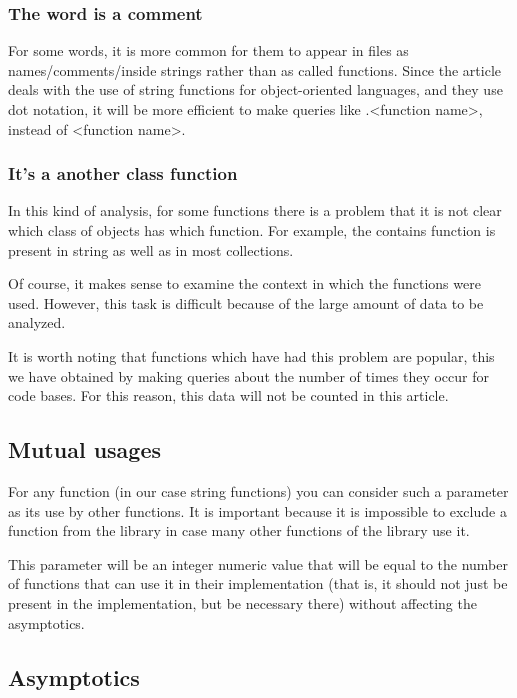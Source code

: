 \documentclass[anonymous,sigplan,review,11pt,nonacm,natbib=false]{acmart}
\begin{document}
    \subsubsection{The word is a comment} \hl{}

    For some words, it is more common for them to appear in files as names/comments/inside strings rather than as called functions. Since the article deals with the use of string functions for object-oriented languages, and they use dot notation, it will be more efficient to make queries like .<function name>, instead of <function name>.

    \subsubsection{It's a another class function} \hl{}

    In this kind of analysis, for some functions there is a problem that it is not clear which class of objects has which function. For example, the contains function is present in string as well as in most collections.

    Of course, it makes sense to examine the context in which the functions were used. However, this task is difficult because of the large amount of data to be analyzed.

    It is worth noting that functions which have had this problem are popular, this we have obtained by making queries about the number of times they occur for code bases. For this reason, this data will not be counted in this article.

    \subsection{Mutual usages}

    For any function (in our case string functions) you can consider such a parameter as its use by other functions. It is important because it is impossible to exclude a function from the library in case many other functions of the library use it.

    This parameter will be an integer numeric value that will be equal to the number of functions that can use it in their implementation (that is, it should not just be present in the implementation, but be necessary there) without affecting the asymptotics.

    \subsection{Asymptotics}
\end{document}
